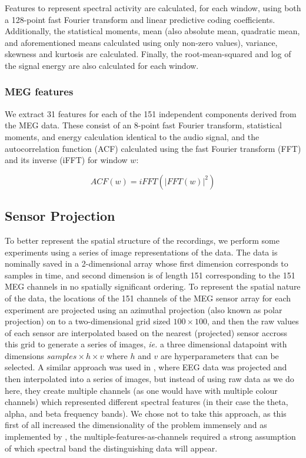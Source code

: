 \documentclass[utf8]{frontiersSCNS} %
\begin{document}
Features to represent spectral activity are calculated, for each window, using both a 128-point fast Fourier transform and linear predictive coding coefficients. Additionally, the statistical moments, mean (also absolute mean, quadratic mean, and aforementioned means calculated using only non-zero values), variance, skewness and kurtosis are calculated. Finally, the root-mean-squared and log of the signal energy are also calculated for each window.

\subsubsection{MEG features}

We extract 31 features for each of the 151 independent components derived from the MEG data. These consist of an 8-point fast Fourier transform, statistical moments, and energy calculation identical to the audio signal, and the autocorrelation function (ACF) calculated using the fast Fourier transform (FFT) and its inverse (iFFT) for window $w$:


\begin{equation}
  ACF(w) = iFFT(|FFT(w)|^2)
  \label{eq1}
\end{equation}

\subsection{Sensor Projection}\label{sec:sens_proj}

To better represent the spatial structure of the recordings, we perform some experiments using a series of image representations of the data. The data is nominally saved in a 2-dimensional array whose first dimension corresponds to samples in time, and second dimension is of length 151 corresponding to the 151 MEG channels in no spatially significant ordering. To represent the spatial nature of the data, the locations of the 151 channels of the MEG sensor array for each experiment are projected using an azimuthal projection (also known as polar projection) on to a two-dimensional grid sized $100 \times 100$, and then the raw values of each sensor are  interpolated based on the nearest (projected) sensor accross this grid to generate a series of images, \emph{ie.} a three dimensional datapoint with dimensions $samples \times  h \times v$ where $h$ and $v$ are hyperparameters that can be selected. A similar approach was used in \cite{Bashivan2016}, where EEG data was projected and then interpolated into a series of images, but instead of using raw data as we do here, they create multiple channels (as one would have with multiple colour channels) which represented different spectral features (in their case the theta, alpha, and beta frequency bands). We chose not to take this approach, as this first of all increased the dimensionality of the problem immensely and as implemented by \cite{Bashivan2016}, the multiple-features-as-channels required a strong assumption of which spectral band the distinguishing data will appear.
\end{document}
